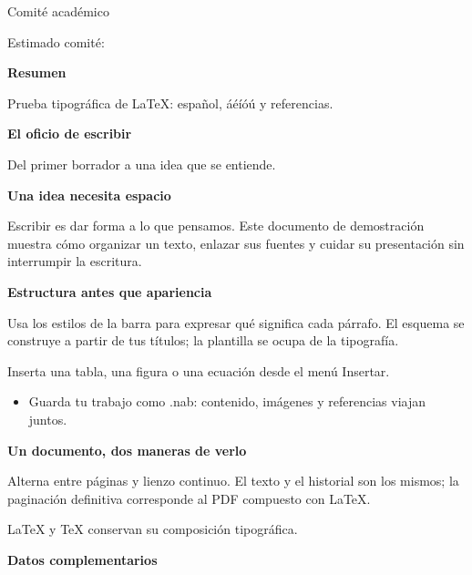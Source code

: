 \documentclass[12pt,a4paper]{letter}
\date{}
\begin{document}
\begin{letter}{Comité académico}
\opening{Estimado comité:}
{\large\bfseries Resumen\par}
Prueba tipográfica de \LaTeX{}: español, áéíóú y referencias.
\fontsize{12.0}{14.399999999999999}\selectfont
{\LARGE\bfseries El oficio de escribir\par}

{\large Del primer borrador a una idea que se entiende.\par}

\par\medskip{}\label{b3C9EB2A7-151E-452C-898C-C2E310F8CC02}{\large\bfseries Una idea necesita espacio\par}

Escribir es dar forma a lo que pensamos. Este documento de demostración muestra cómo organizar un texto, enlazar sus fuentes y cuidar su presentación sin interrumpir la escritura.

\par\medskip{}\label{b4444FE3B-8BAB-49E9-B630-0BED1B6EE8B5}{\large\bfseries Estructura antes que apariencia\par}

Usa los estilos de la barra para expresar qué significa cada párrafo. El esquema se construye a partir de tus títulos; la plantilla se ocupa de la tipografía.

Inserta una tabla, una figura o una ecuación desde el menú Insertar.

\begin{itemize}
\item Guarda tu trabajo como .nab: contenido, imágenes y referencias viajan juntos.

\end{itemize}
\par\medskip{}\label{b748A2195-4C7F-43CE-83F6-7100733DFB03}{\large\bfseries Un documento, dos maneras de verlo\par}

Alterna entre páginas y lienzo continuo. El texto y el historial son los mismos; la paginación definitiva corresponde al PDF compuesto con \LaTeX{}.

\LaTeX{} y \TeX{} conservan su composición tipográfica.

\par\medskip{}\label{bF75E1FE4-C928-4AEC-B19B-06EED4C4FCEC}{\large\bfseries Datos complementarios\par}


\end{letter}
\end{document}
